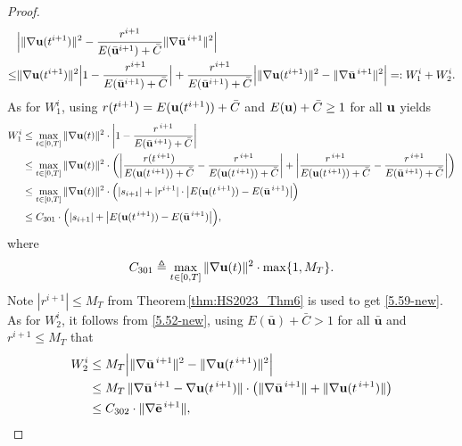 \documentclass{article}
\theoremstyle{definition}                   %
\begin{document}
\begin{proof}
\begin{align}
& \Bigl|
\|\nabla {\bf u}(t^{i+1})\|^2
-
\frac{r^{i+1}}{E(\bar{\bf u}^{i+1})+\bar{C}}
\|\nabla \bar{\bf u}^{\,i+1}\|^2
\Bigr| \notag\\
\le &
\|\nabla {\bf u}(t^{i+1})\|^2
\Bigl|
1-\frac{r^{i+1}}{E(\bar{\bf u}^{i+1})+\bar{C}}
\Bigr|
+\frac{r^{i+1}}{E(\bar{\bf u}^{i+1})+\bar{C}}
\Bigl|
\|\nabla {\bf u}(t^{i+1})\|^2
-
\|\nabla \bar{\bf u}^{\,i+1}\|^2
\Bigr|
=: W^i_1 + W^i_2.
\label{5.58}
\end{align}
As for $W^i_1$, using 
$r(t^{i+1})=E({\bf u}(t^{i+1}))+\bar{C}$ and 
$E({\bf u})+\bar{C}\ge 1$ for all ${\bf u}$  yields
\begin{align}
W^i_1
&\le \max_{t\in[0,T]} \|\nabla{\bf u}(t)\|^2 \cdot
\left|
1-\frac{r^{\,i+1}}{E(\bar{\bf u}^{\,i+1})+\bar{C}}
\right|
\notag\\
&\le \max_{t\in[0,T]} \|\nabla{\bf u}(t)\|^2 \cdot 
\left( 
\left|
\frac{r(t^{\,i+1})}{E({\bf u}(t^{\,i+1}))+\bar{C}}
-
\frac{r^{\,i+1}}{E({\bf u}(t^{\,i+1}))+\bar{C}}
\right|
+ 
\left|
\frac{r^{\,i+1}}{E({\bf u}(t^{\,i+1}))+\bar{C}}
-
\frac{r^{\,i+1}}{E(\bar{\bf u}^{\,i+1})+\bar{C}}
\right| \right)
\notag\\
&\le \max_{t\in[0,T]} \|\nabla{\bf u}(t)\|^2 \cdot
\Bigl(|s_{i+1}|+ 
 |r^{i+1}|\cdot \bigl|E({\bf u}(t^{\,i+1}))-E(\bar{\bf u}^{\,i+1})\bigr| 
\Bigr)
\notag\\
&\le C_{301} \cdot 
\Bigl(|s_{i+1}|+ 
 \bigl|E({\bf u}(t^{\,i+1}))-E(\bar{\bf u}^{\,i+1})\bigr| 
\Bigr),
\label{5.59-new}
\end{align}
where 
\begin{align}
C_{301}\triangleq \max_{t\in[0,T]} \|\nabla{\bf u}(t)\|^2 \cdot \max\{1, M_T\}.
\label{def_C301}
\end{align}
Note $|r^{i+1}|\le M_T$ from Theorem\,\ref{thm:HS2023_Thm6} is used to get \eqref{5.59-new}.
%
As for $W_2^i$, it follows from \eqref{5.52-new}, using $E(\bar{\mathbf u})+\bar C>1$ for all $\bar{\mathbf u}$ 
and $r^{i+1}\le M_T$ that
\begin{align}
W_2^i
&\le M_T \Bigl|  \| \nabla \bar{\bf u}^{\,i+1} \|^2
      - \| \nabla {\bf u}(t^{\,i+1}) \|^2 \Bigr| 
      \notag\\
&\le M_T \, \| \nabla \bar{\bf u}^{\,i+1}
           - \nabla {\bf u}(t^{\,i+1}) \|
      \cdot \bigl( \| \nabla \bar{\bf u}^{\,i+1} \|
            + \| \nabla {\bf u}(t^{\,i+1}) \| \bigr) 
            \notag\\
&\le C_{302} \cdot \| \nabla \bar{\bf e}^{\,i+1} \|,
\label{5.60-new}
\end{align}

\end{proof}
\end{document}
